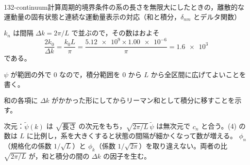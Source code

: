 \documentclass[uplatex,dvipdfmx,a4paper,11pt]{jsarticle}
\begin{document}
\begin{mondai}{132-continuum}{計算}{周期的境界条件の系の長さを無限大にしたときの，離散的な運動量の固有状態と連続な運動量表示の対応（和と積分，$\delta_{nm}$ とデルタ関数）}
\begin{tadashii}
$k_{n}$ は間隔 $\Delta k=2\pi/L$ で並ぶので，その数はおよそ
\[ \frac{2k_{0}}{\Delta k}=\frac{k_{0}L}{\pi}=\frac{\num{5.12e9}\times\num{1.00e-6}}{\pi}=\num{1.6e3} \]
である。
\begin{ronten}
  \item {} $\psi$ が範囲の外で $0$ なので，積分範囲を $0$ から $L$ から全区間に広げてよいことを書く。
  \item {} 和の各項に $\Delta k$ がかかった形にしてからリーマン和として積分に移すことを示す。
\end{ronten}
\kenzan 次元：$\tilde{\psi}(k)$ は $\sqrt{\text{長さ}}$ の次元をもち，$\sqrt{2\pi/L}\,\tilde{\psi}$ は無次元で $c_{n}$ と合う。(4) の数は $L$ に比例し，系を大きくすると状態の間隔が細かくなって数が増える。
\tsumazuki $\phi_{n}$（規格化の係数 $1/\sqrt{L}$）と $\phi_{k}$（係数 $1/\sqrt{2\pi}$）を取り違えない。両者の比 $\sqrt{2\pi/L}$ が，和と積分の間の $\Delta k$ の因子を生む。
\end{tadashii}
\end{mondai}
\end{document}
